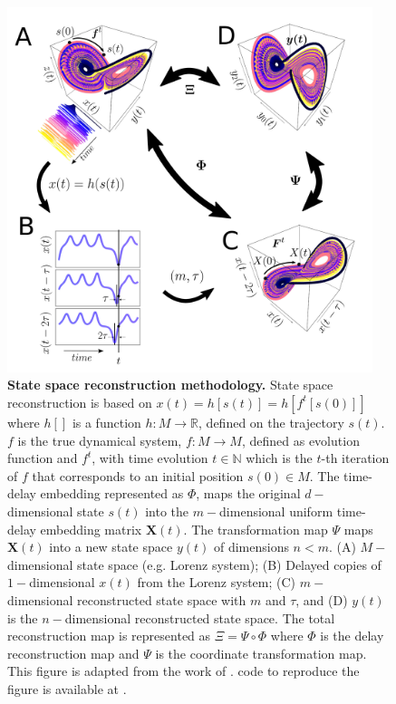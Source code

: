 \begin{figure}
  \centering
    \includegraphics[width=0.95\textwidth]{fig_3_01}
    \caption[State space reconstruction methodology]{
	{\bf State space reconstruction methodology.}
	State space reconstruction is based on $x(t)=h[s(t)]= h[f^t [s(0)]]$
	where $h[ ]$ is a function $h: M \rightarrow \mathbb{R}$, defined on 
	the trajectory $s(t)$. $f$ is the true dynamical system, 
	$f:M \rightarrow M$, defined as evolution function and $f^t$, 
	with time evolution $t \in \mathbb{N}$ which is the $t$-th iteration 
	of $f$ that corresponds to an initial position $s(0) \in M $. 
	The time-delay embedding represented as $\Phi$, maps the original
    	$d-$dimensional state $s(t)$ into the $m-$dimensional uniform 
	time-delay embedding matrix $\boldsymbol{X}(t)$.
	The transformation map $\Psi$ maps $\boldsymbol{X}(t)$ into a 
	new state space $y(t)$ of dimensions $n < m$.
	(A) $M-$dimensional state space (e.g. Lorenz system);
    	(B) Delayed copies of $1-$dimensional $x(t)$ from the Lorenz system;
    	(C) $m-$dimensional reconstructed state space with 
	\texorpdfstring{$m$}{m} and    \texorpdfstring{$\tau$}{T}, and 
    	(D) $y(t)$ is the $n-$dimensional reconstructed state space.
	The total reconstruction map is represented as $\Xi = \Psi \circ \Phi $
	where $\Phi$ is the delay reconstruction map and 
	$\Psi$ is the coordinate transformation map.
	This figure is adapted from the work of 
   	\cite{Quintana-Duque2012, casdagli1991, uzal2011}.
	\R code to reproduce the figure is available at 
	.
    }
    \label{fig:ssr}
\end{figure}


